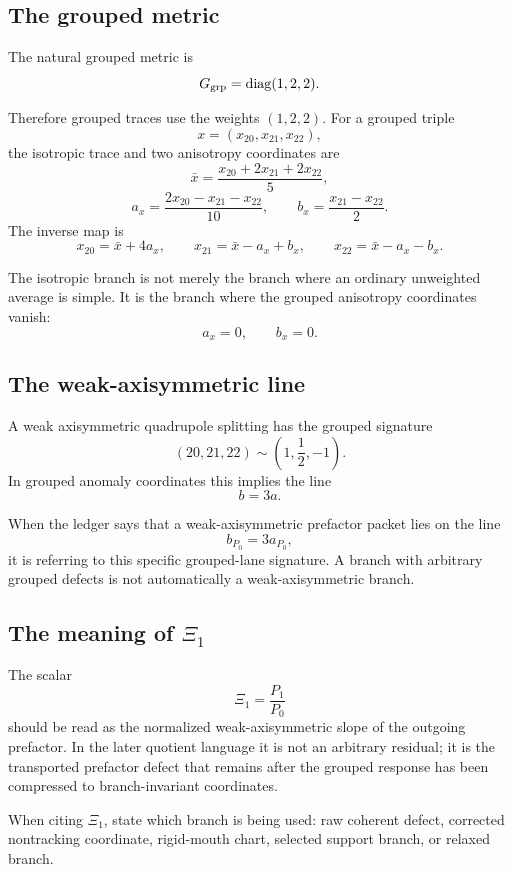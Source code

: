 \subsection{The grouped metric}
\label{subsec:grouped-metric}

The natural grouped metric is
\[
G_{\rm grp}=\mathrm{diag}(1,2,2).
\]

Therefore grouped traces use the weights \((1,2,2)\).  For a grouped triple
\[
x=(x_{20},x_{21},x_{22}),
\]
the isotropic trace and two anisotropy coordinates are
\[
\bar x
=
\frac{x_{20}+2x_{21}+2x_{22}}{5},
\]
\[
a_x
=
\frac{2x_{20}-x_{21}-x_{22}}{10},
\qquad
b_x
=
\frac{x_{21}-x_{22}}{2}.
\]
The inverse map is
\[
x_{20}=\bar x+4a_x,
\qquad
x_{21}=\bar x-a_x+b_x,
\qquad
x_{22}=\bar x-a_x-b_x.
\]

The isotropic branch is not merely the branch where an ordinary unweighted average is simple.  It is the branch where the grouped anisotropy coordinates vanish:
\[
a_x=0,
\qquad
b_x=0.
\]

\subsection{The weak-axisymmetric line}
\label{subsec:weak-axisymmetric-line}

A weak axisymmetric quadrupole splitting has the grouped signature
\[
(20,21,22)\sim \left(1,\frac12,-1\right).
\]
In grouped anomaly coordinates this implies the line
\[
b=3a.
\]

When the ledger says that a weak-axisymmetric prefactor packet lies on the line
\[
b_{P_0}=3a_{P_0},
\]
it is referring to this specific grouped-lane signature.  A branch with arbitrary grouped defects is not automatically a weak-axisymmetric branch.

\subsection{The meaning of \texorpdfstring{\(\Xi_1\)}{Xi1}}
\label{subsec:meaning-of-xi1}

The scalar
\[
\Xi_1=\frac{P_1}{P_0}
\]
should be read as the normalized weak-axisymmetric slope of the outgoing prefactor.  In the later quotient language it is not an arbitrary residual; it is the transported prefactor defect that remains after the grouped response has been compressed to branch-invariant coordinates.

When citing \(\Xi_1\), state which branch is being used: raw coherent defect, corrected nontracking coordinate, rigid-mouth chart, selected support branch, or relaxed branch.

